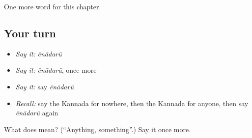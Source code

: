 \begin{grammarlens}[title={What you've built}]
One more word for this chapter.
\end{grammarlens}

\subsection*{Your turn}
\begin{itemize}
\raggedright
  \item \emph{Say it:} \emph{ēnādarū}
  \item \emph{Say it:} \emph{ēnādarū}, once more
  \item \emph{Say it:} say \emph{ēnādarū}
  \item \emph{Recall:} say the Kannada for nowhere, then the Kannada for anyone, then say \emph{ēnādarū} again
\end{itemize}

\begin{tcolorbox}[breakable,colback=teal!4,colframe=teal!35!black,title={Before you move on}]
What does  mean? (\textquotedblleft{}Anything, something\textquotedblright{}.) Say it once more.
\end{tcolorbox}
